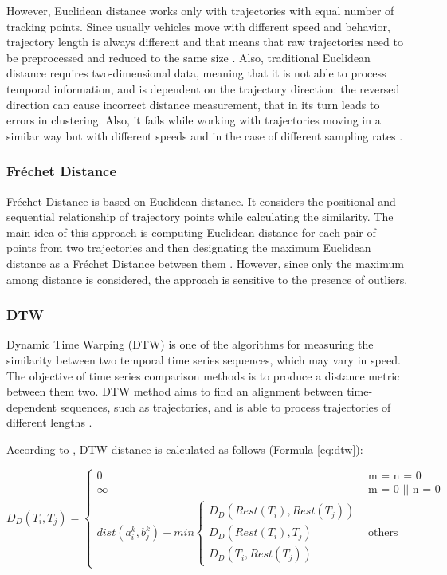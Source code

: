 However, Euclidean distance works only with trajectories with equal number of tracking points. Since usually vehicles move with different speed and behavior, trajectory length is always different and that means that raw trajectories need to be preprocessed and reduced to the same size \cite{inproceedings:7_related_work}. Also, traditional Euclidean distance requires two-dimensional data, meaning that it is not able to process temporal information, and is dependent on the trajectory direction: the reversed direction can cause incorrect distance measurement, that in its turn leads to errors in clustering. Also, it fails while working with trajectories moving in a similar way but with different speeds and in the case of different sampling rates \cite{inproceedings:28_lcss_dsmt}.

\subsubsection{Fréchet Distance}
Fréchet Distance is based on Euclidean distance. It considers the positional and sequential relationship of trajectory points while calculating the similarity. The main idea of this approach is computing Euclidean distance for each pair of points from two trajectories and then designating the maximum Euclidean distance as a Fréchet Distance between them \cite{article:8_review_mot_cl_alg}\cite{inproceedings:29_fr_dist}. However, since only the maximum among distance is considered, the approach is sensitive to the presence of outliers.

\subsubsection{DTW}
Dynamic Time Warping (DTW) is one of the algorithms for measuring the similarity between two temporal time series sequences, which may vary in speed. The objective of time series comparison methods is to produce a distance metric between them two. DTW method aims to find an alignment between time-dependent sequences, such as trajectories, and is able to process trajectories of different lengths \cite{article:8_review_mot_cl_alg}. 

According to \cite{article:8_review_mot_cl_alg}, DTW distance is calculated as follows (Formula \ref{eq:dtw}):

\begin{equation} \label{eq:dtw}
	D_D(T_i, T_j) = 
		\begin{cases}
			0 				&\text{m = n = 0}\\
			\infty 			&\text{m = 0 || n = 0}\\
			dist(a_i^k, b_j^k) + min 
				\begin{cases}
					D_D(Rest(T_i), Rest(T_j))\\
					D_D(Rest(T_i), T_j)\\
					D_D(T_i, Rest(T_j))
				\end{cases} &\text{others}
		\end{cases}
\end{equation}

